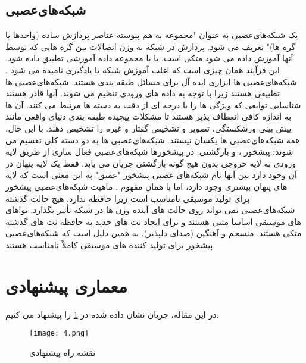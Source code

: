 \subsection{شبکه‌های‌عصبی}
یک شبکه‌های‌عصبی به عنوان "مجموعه به هم پیوسته عناصر پردازش ساده (واحدها یا گره ها)" تعریف می شود.
پردازش در شبکه به وزن اتصالات بین گره هایی که توسط آنها آموزش داده می شود متکی است.
یا با مجموعه داده آموزشی تطبیق داده شود. این فرآیند همان چیزی است که اغلب آموزش شبکه یا یادگیری نامیده می شود
.  شبکه‌های‌عصبی ها ابزاری ایده آل برای مسائل طبقه بندی هستند.  شبکه‌های‌عصبی ها تطبیقی ​هستند زیرا با توجه به داده های ورودی تنظیم می شوند.  آنها قادر هستند
شناسایی توابعی که ویژگی ها را با درجه ای از دقت به دسته ها مرتبط می کنند. آن ها 
به اندازه کافی انعطاف پذیر هستند تا مشکلات پیچیده طبقه بندی دنیای واقعی مانند پیش بینی ورشکستگی، تصویر و
تشخیص گفتار و غیره را تشخیص دهند.  با این حال، همه شبکه‌های‌عصبی ها یکسان نیستند.  
شبکه‌های‌عصبی ها به دو دسته کلی تقسیم می شوند: پیشخور ، و بازگشتی.  در پیشخورها شبکه‌های‌عصبی  فعال سازی
از طریق لایه ورودی به لایه خروجی بدون هیچ گونه بازگشتی جریان می یابد.  فقط یک لایه پنهان در آن وجود دارد
بین آنها نام شبکه‌های عصبی پیشخور "عمیق" به این معنی است که لایه های پنهان بیشتری وجود دارد، اما با همان مفهوم
. ماهیت شبکه‌های‌عصبی پیشخور برای تولید موسیقی نامناسب است زیرا حافظه ندارد.
 هیچ حالت گذشته شبکه‌های‌عصبی نمی تواند روی حالت های آینده وزن ها در شبکه تأثیر بگذارد. 
نواهای های موسیقی اساسا متنی هستند و برای ایجاد نت های جدید به حافظه نت های گذشته متکی هستند.
منسجم و آهنگین (صدای دلپذیر). به همین دلیل است که شبکه‌های‌عصبی پیشخور برای تولید کننده های موسیقی کاملاً نامناسب هستند.
\section{معماری پیشنهادی}
در این مقاله، جریان نشان داده شده در
\cref{fig.121}
را پیشنهاد می کنیم.
\begin{figure}[!h]
\texttt{[image: 4.png]}
\caption{نقشه راه پیشنهادی}\label{fig.121}
\end{figure}
